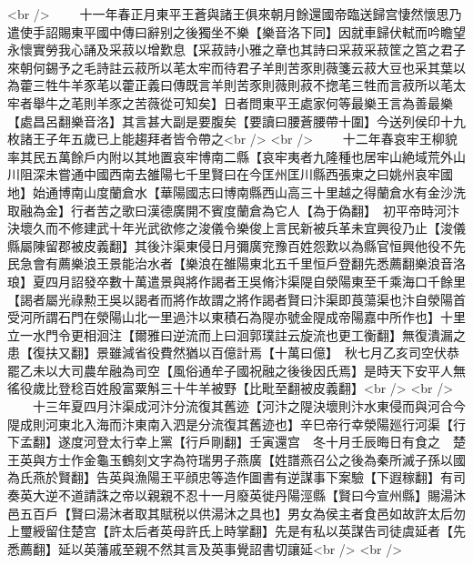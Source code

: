 <br />
　　十一年春正月東平王蒼與諸王俱來朝月餘還國帝臨送歸宫悽然懷思乃遣使手詔賜東平國中傳曰辭别之後獨坐不樂【樂音洛下同】因就車歸伏軾而吟瞻望永懷實勞我心誦及采菽以增歎息【采菽詩小雅之章也其詩曰采菽采菽筐之筥之君子來朝何錫予之毛詩註云菽所以芼太牢而待君子羊則苦豕則薇箋云菽大豆也采其葉以為藿三牲牛羊豕芼以藿正義曰傳既言羊則苦豕則薇則菽不揔芼三牲而言菽所以芼太牢者舉牛之芼則羊豕之苦薇從可知矣】日者問東平王處家何等最樂王言為善最樂【處昌呂翻樂音洛】其言甚大副是要腹矣【要讀曰腰蒼腰帶十圍】今送列侯印十九枚諸王子年五歲已上能趨拜者皆令帶之<br />
<br />
　　十二年春哀牢王柳貌率其民五萬餘戶内附以其地置哀牢博南二縣【哀牢夷者九隆種也居牢山絶域荒外山川阻深未嘗通中國西南去雒陽七千里賢曰在今匡州匡川縣西張柬之曰姚州哀牢國地】始通博南山度蘭倉水【華陽國志曰博南縣西山高三十里越之得蘭倉水有金沙洗取融為金】行者苦之歌曰漢德廣開不賓度蘭倉為它人【為于偽翻】　初平帝時河汴決壞久而不修建武十年光武欲修之浚儀令樂俊上言民新被兵革未宜興役乃止【浚儀縣屬陳留郡被皮義翻】其後汴渠東侵日月彌廣兖豫百姓怨歎以為縣官恒興他役不先民急會有薦樂浪王景能治水者【樂浪在雒陽東北五千里恒戶登翻先悉薦翻樂浪音洛琅】夏四月詔發卒數十萬遣景與將作謁者王吳脩汴渠隄自滎陽東至千乘海口千餘里【謁者屬光祿勲王吳以謁者而將作故謂之將作謁者賢曰汴渠即莨蕩渠也汴自滎陽首受河所謂石門在滎陽山北一里過汴以東積石為隄亦號金隄成帝陽嘉中所作也】十里立一水門令更相洄注【爾雅曰逆流而上曰洄郭璞註云旋流也更工衡翻】無復潰漏之患【復扶又翻】景雖減省役費然猶以百億計焉【十萬曰億】　秋七月乙亥司空伏恭罷乙未以大司農牟融為司空【風俗通牟子國祝融之後後因氏焉】是時天下安平人無徭役歲比登稔百姓殷富粟斛三十牛羊被野【比毗至翻被皮義翻】<br />
<br />
　　十三年夏四月汴渠成河汴分流復其舊迹【河汴之隄決壞則汴水東侵而與河合今隄成則河東北入海而汴東南入泗是分流復其舊迹也】辛巳帝行幸滎陽廵行河渠【行下孟翻】遂度河登太行幸上黨【行戶剛翻】壬寅還宫　冬十月壬辰晦日有食之　楚王英與方士作金龜玉鶴刻文字為符瑞男子燕廣【姓譜燕召公之後為秦所滅子孫以國為氏燕於賢翻】告英與漁陽王平顔忠等造作圖書有逆謀事下案驗【下遐稼翻】有司奏英大逆不道請誅之帝以親親不忍十一月廢英徙丹陽涇縣【賢曰今宣州縣】賜湯沐邑五百戶【賢曰湯沐者取其賦税以供湯沐之具也】男女為侯主者食邑如故許太后勿上璽綬留住楚宫【許太后者英母許氏上時掌翻】先是有私以英謀告司徒虞延者【先悉薦翻】延以英藩戚至親不然其言及英事覺詔書切讓延<br />
<br />
